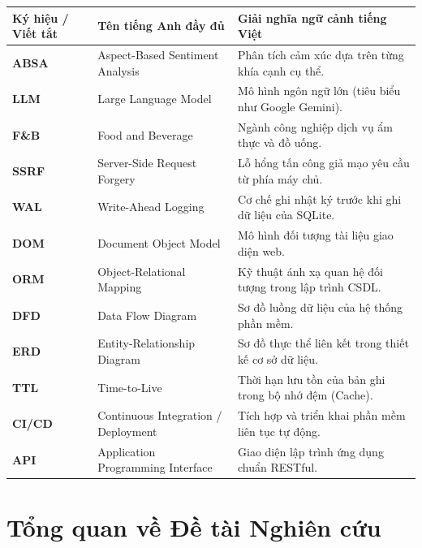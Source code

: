 \documentclass[12pt, a4paper]{article}
\begin{document}
\begin{table}[H]
\centering
\begin{tabularx}{\textwidth}{l l X}
\toprule
\rowcolor{blue!8}
\textbf{Ký hiệu / Viết tắt} & \textbf{Tên tiếng Anh đầy đủ} & \textbf{Giải nghĩa ngữ cảnh tiếng Việt} \\
\midrule
\textbf{ABSA} & Aspect-Based Sentiment Analysis & Phân tích cảm xúc dựa trên từng khía cạnh cụ thể. \\
\textbf{LLM} & Large Language Model & Mô hình ngôn ngữ lớn (tiêu biểu như Google Gemini). \\
\textbf{F\&B} & Food and Beverage & Ngành công nghiệp dịch vụ ẩm thực và đồ uống. \\
\textbf{SSRF} & Server-Side Request Forgery & Lỗ hổng tấn công giả mạo yêu cầu từ phía máy chủ. \\
\textbf{WAL} & Write-Ahead Logging & Cơ chế ghi nhật ký trước khi ghi dữ liệu của SQLite. \\
\textbf{DOM} & Document Object Model & Mô hình đối tượng tài liệu giao diện web. \\
\textbf{ORM} & Object-Relational Mapping & Kỹ thuật ánh xạ quan hệ đối tượng trong lập trình CSDL. \\
\textbf{DFD} & Data Flow Diagram & Sơ đồ luồng dữ liệu của hệ thống phần mềm. \\
\textbf{ERD} & Entity-Relationship Diagram & Sơ đồ thực thể liên kết trong thiết kế cơ sở dữ liệu. \\
\textbf{TTL} & Time-to-Live & Thời hạn lưu tồn của bản ghi trong bộ nhớ đệm (Cache). \\
\textbf{CI/CD} & Continuous Integration / Deployment & Tích hợp và triển khai phần mềm liên tục tự động. \\
\textbf{API} & Application Programming Interface & Giao diện lập trình ứng dụng chuẩn RESTful. \\
\bottomrule
\end{tabularx}
\end{table}

\newpage
{}
\setcounter{page}{1}

\section{Tổng quan về Đề tài Nghiên cứu}
\end{document}
